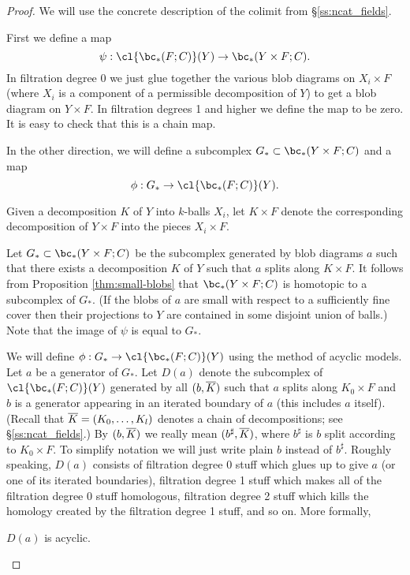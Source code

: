 \begin{proof}
We will use the concrete description of the colimit from \S\ref{ss:ncat_fields}.

First we define a map 
\[
	\psi: \cl{\bc_*(F; C)}(Y) \to \bc_*(Y\times F;C) .
\]
In filtration degree 0 we just glue together the various blob diagrams on $X_i\times F$
(where $X_i$ is a component of a permissible decomposition of $Y$) to get a blob diagram on
$Y\times F$.
In filtration degrees 1 and higher we define the map to be zero.
It is easy to check that this is a chain map.

In the other direction, we will define a subcomplex $G_*\sub \bc_*(Y\times F;C)$
and a map
\[
	\phi: G_* \to \cl{\bc_*(F; C)}(Y) .
\]

Given a decomposition $K$ of $Y$ into $k$-balls $X_i$, let $K\times F$ denote the corresponding
decomposition of $Y\times F$ into the pieces $X_i\times F$.

Let $G_*\sub \bc_*(Y\times F;C)$ be the subcomplex generated by blob diagrams $a$ such that there
exists a decomposition $K$ of $Y$ such that $a$ splits along $K\times F$.
It follows from Proposition \ref{thm:small-blobs} that $\bc_*(Y\times F; C)$ is homotopic to a subcomplex of $G_*$.
(If the blobs of $a$ are small with respect to a sufficiently fine cover then their
projections to $Y$ are contained in some disjoint union of balls.)
Note that the image of $\psi$ is equal to $G_*$.

We will define $\phi: G_* \to \cl{\bc_*(F; C)}(Y)$ using the method of acyclic models.
Let $a$ be a generator of $G_*$.
Let $D(a)$ denote the subcomplex of $\cl{\bc_*(F; C)}(Y)$ generated by all $(b, \overline{K})$
such that $a$ splits along $K_0\times F$ and $b$ is a generator appearing
in an iterated boundary of $a$ (this includes $a$ itself).
(Recall that $\overline{K} = (K_0,\ldots,K_l)$ denotes a chain of decompositions;
see \S\ref{ss:ncat_fields}.)
By $(b, \overline{K})$ we really mean $(b^\sharp, \overline{K})$, where $b^\sharp$ is 
$b$ split according to $K_0\times F$.
To simplify notation we will just write plain $b$ instead of $b^\sharp$.
Roughly speaking, $D(a)$ consists of filtration degree 0 stuff which glues up to give
$a$ (or one of its iterated boundaries), filtration degree 1 stuff which makes all of the filtration degree 0 stuff homologous, 
filtration degree 2 stuff which kills the homology created by the 
filtration degree 1 stuff, and so on.
More formally,
 
\begin{lemma} \label{lem:d-a-acyclic}
$D(a)$ is acyclic.
\end{lemma}


\end{proof}
